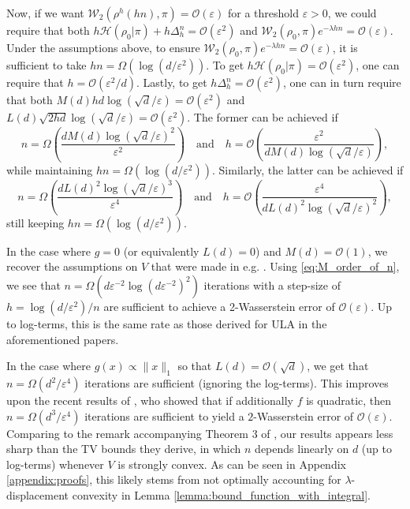 \documentclass[final,12pt]{colt2018}
\newcommand{\was}{\mathcal{W}}
\begin{document}
Now, if we want $\was_2 (\rho^{h}(hn),\pi) =  \mathcal{O}(\varepsilon)$ for a threshold $\varepsilon >0$, we could require that both $h\mathcal{H}(\rho_{0} | \pi) + h\Delta_{h}^{n} =  \mathcal{O}( \varepsilon^2)$ and  $\was_2(\rho_0,\pi)e^{-\lambda hn} = \mathcal{O}(\varepsilon)$. Under the assumptions above, to ensure $\was_2(\rho_0,\pi)e^{-\lambda hn} = \mathcal{O}(\varepsilon)$, it is sufficient to take $hn = \Omega(\log(d/\varepsilon^2))$. To get $h\mathcal{H}(\rho_{0} | \pi) = \mathcal{O}( \varepsilon^2)$, one can require that $h = \mathcal{O}(\varepsilon^2/d)$. Lastly, to get $h\Delta_{h}^{n} =\mathcal{O}(\varepsilon^2)$, one can in turn require that both $M(d)hd \log(\sqrt{d}/\varepsilon) = \mathcal{O}(\varepsilon^2)$ and  $L(d)\sqrt{2hd}\log(\sqrt{d}/\varepsilon) = \mathcal{O}( \varepsilon^2)$. The former can be achieved if 
\begin{equation}\label{eq:M_order_of_n}
n = \Omega\left( \frac{d M(d) \log(\sqrt{d}/\varepsilon)^2}{\varepsilon^2}\right) \quad \text{and} \quad h = \mathcal{O}\left( \frac{\varepsilon^2}{d M(d) \log(\sqrt{d}/\varepsilon)}\right),
\end{equation}
while maintaining  $hn = \Omega(\log(d/\varepsilon^2))$. Similarly, the latter can be achieved if
\begin{equation}\label{eq:L_order_of_n}
n = \Omega\left( \frac{d L(d)^2 \log(\sqrt{d}/\varepsilon)^3}{\varepsilon^4}\right) \quad\text{and} \quad h = \mathcal{O}\left( \frac{\varepsilon^4}{d L(d)^2 \log(\sqrt{d}/\varepsilon)^2}\right),
\end{equation}
still keeping $hn = \Omega(\log(d/\varepsilon^2))$.

In the case where $g=0$ (or equivalently $L(d) = 0$) and $M(d) = \mathcal{O}(1)$, we recover the assumptions on $V$ that were made in e.g. \citet{dalalyan2017further, dalalyan2017user}. Using \eqref{eq:M_order_of_n}, we see that $n  = \Omega(d \varepsilon^{-2} \log(d \varepsilon^{-2})^2)$ iterations with a step-size of $h = \log(d/\varepsilon^2)/n$ are sufficient to achieve a 2-Wasserstein error of $\mathcal{O}(\varepsilon)$. Up to log-terms, this is the same rate as those derived for ULA in the aforementioned papers. 

In the case where $g(x) \propto \|x\|_1$ so that $L(d) = \mathcal{O}(\sqrt{d})$, we get that $n = \Omega(d^2/\varepsilon^4)$ iterations are sufficient (ignoring the log-terms). This improves upon the recent results of \citet{grappin2018thesis}, who showed that if additionally $f$ is quadratic, then $n = \Omega(d^3/\varepsilon^4)$ iterations are sufficient to yield a $2$-Wasserstein error of $\mathcal{O}(\varepsilon)$. Comparing to the remark accompanying Theorem 3 of \citet{durmus2016efficient}, our results appears less sharp than the TV bounds they derive, in which $n$ depends linearly on $d$ (up to log-terms) whenever $V$ is strongly convex. As can be seen in Appendix \ref{appendix:proofs}, this likely stems from not optimally accounting for $\lambda$-displacement convexity in Lemma \ref{lemma:bound_function_with_integral}.
\end{document}
